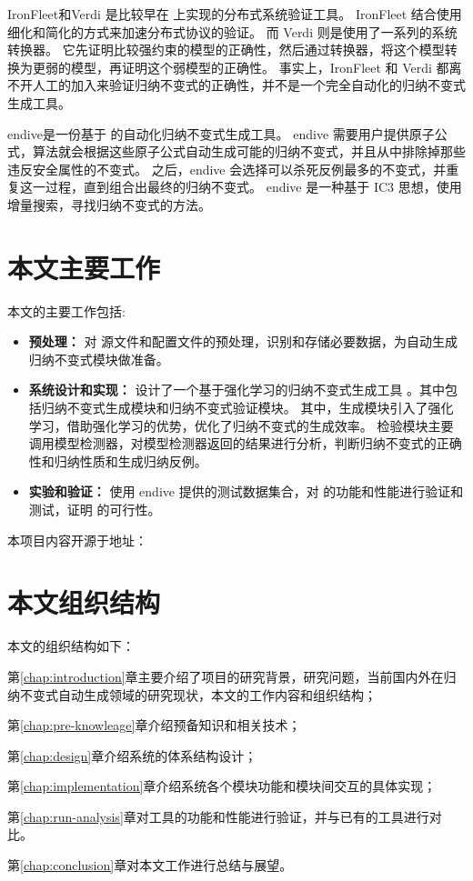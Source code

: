 IronFleet\cite{IronFleet}和Verdi\cite{Verdi} 是比较早在 \TLA 上实现的分布式系统验证工具。
IronFleet 结合使用细化和简化的方式来加速分布式协议的验证。
而 Verdi 则是使用了一系列的系统转换器。
它先证明比较强约束的模型的正确性，然后通过转换器，将这个模型转换为更弱的模型，再证明这个弱模型的正确性。
事实上，IronFleet 和 Verdi 都离不开人工的加入来验证归纳不变式的正确性，并不是一个完全自动化的归纳不变式生成工具。

endive\cite{endive}是一份基于 \TLA 的自动化归纳不变式生成工具。
endive 需要用户提供原子公式，算法就会根据这些原子公式自动生成可能的归纳不变式，并且从中排除掉那些违反安全属性的不变式。
之后，endive 会选择可以杀死反例最多的不变式，并重复这一过程，直到组合出最终的归纳不变式。
endive 是一种基于 IC3 思想，使用增量搜索，寻找归纳不变式的方法。

\section{本文主要工作}

本文的主要工作包括:
\begin{itemize}
    \item \textbf{预处理：} 对 \TLA 源文件和配置文件的预处理，识别和存储必要数据，为自动生成归纳不变式模块做准备。
    \item \textbf{系统设计和实现：} 设计了一个基于强化学习的归纳不变式生成工具 \rltla。其中包括归纳不变式生成模块和归纳不变式验证模块。
    其中，生成模块引入了强化学习，借助强化学习的优势，优化了归纳不变式的生成效率。
    检验模块主要调用模型检测器，对模型检测器返回的结果进行分析，判断归纳不变式的正确性和归纳性质和生成归纳反例。
    \item \textbf{实验和验证：} 使用 endive 提供的测试数据集合，对 \rltla 的功能和性能进行验证和测试，证明 \rltla 的可行性。
\end{itemize}

本项目内容开源于地址：

\section{本文组织结构}
本文的组织结构如下：

第\ref{chap:introduction}章主要介绍了项目的研究背景，研究问题，当前国内外在归纳不变式自动生成领域的研究现状，本文的工作内容和组织结构；

第\ref{chap:pre-knowleage}章介绍预备知识和相关技术；

第\ref{chap:design}章介绍系统的体系结构设计；

第\ref{chap:implementation}章介绍系统各个模块功能和模块间交互的具体实现；

第\ref{chap:run-analysis}章对工具的功能和性能进行验证，并与已有的工具进行对比。

第\ref{chap:conclusion}章对本文工作进行总结与展望。

